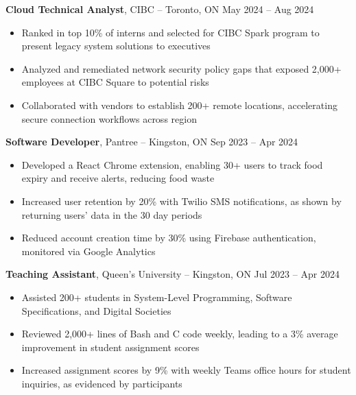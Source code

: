 \textbf{Cloud Technical Analyst}, {CIBC} -- Toronto, ON \hfill May 2024 -- Aug 2024 \\
\vspace{-5pt}
\begin{itemize}
  \item Ranked in top 10\% of interns and selected for CIBC Spark program to present legacy system solutions to executives
  \item Analyzed and remediated network security policy gaps that exposed 2,000+ employees at CIBC Square to potential risks
  \item Collaborated with vendors to establish 200+ remote locations, accelerating secure connection workflows across region  
\end{itemize}
\textbf{Software Developer}, {Pantree} -- Kingston, ON \hfill Sep 2023 -- Apr 2024 \\
\vspace{-5pt}
\begin{itemize}
  \item Developed a React Chrome extension, enabling 30+ users to track food expiry and receive alerts, reducing food waste
  \item Increased user retention by 20\% with Twilio SMS notifications, as shown by returning users' data in the 30 day periods
  \item Reduced account creation time by 30\% using Firebase authentication, monitored via Google Analytics
\end{itemize}
\textbf{Teaching Assistant}, {Queen's University} -- Kingston, ON \hfill Jul 2023 -- Apr 2024 \\
\vspace{-5pt}
\begin{itemize}
  \item Assisted 200+ students in System-Level Programming, Software Specifications, and Digital Societies
  \item Reviewed 2,000+ lines of Bash and C code weekly, leading to a 3\% average improvement in student assignment scores
  \item Increased assignment scores by 9\% with weekly Teams office hours for student inquiries, as evidenced by participants
\end{itemize}
